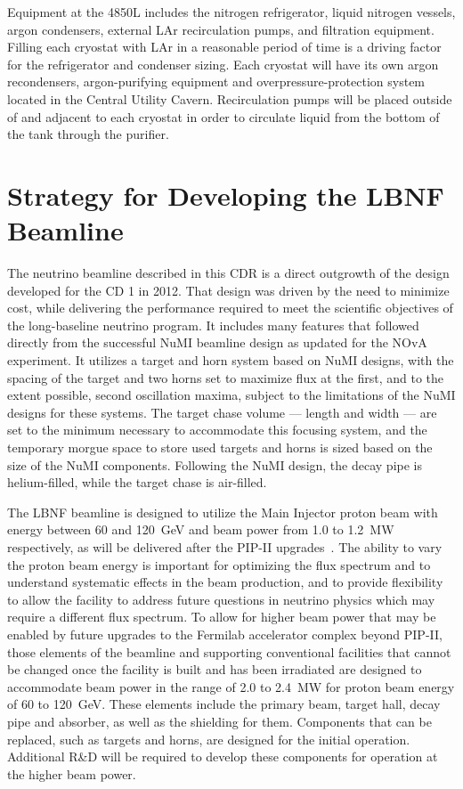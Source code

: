 Equipment at the 4850L includes the nitrogen refrigerator, liquid nitrogen vessels, argon condensers, external LAr recirculation pumps, and filtration equipment. Filling each cryostat with LAr in a reasonable period of time is a driving factor for the refrigerator and condenser sizing.  Each cryostat will have its own argon recondensers, argon-purifying equipment and overpressure-protection system located in the Central Utility Cavern. Recirculation pumps will be placed outside of and adjacent to each cryostat in order to circulate liquid from the bottom of the tank through the purifier.
 
\section{Strategy for Developing the LBNF Beamline}
 
The neutrino beamline described in this CDR is a direct outgrowth of the design~\cite{lbnecdr} developed for the 
CD 1 in 2012.  That design was driven by the need to minimize cost, while delivering the performance required to meet the scientific objectives of the long-baseline neutrino program.  It includes many features that followed directly from the 
successful NuMI beamline design as updated for the NOvA experiment.  It utilizes a target and horn system based on NuMI designs, with the spacing of the target and two horns set to maximize flux at the first, and to the extent possible, second 
oscillation maxima, subject to the limitations of  the NuMI designs for these systems.  The target chase volume --- length and width --- are set to the minimum necessary to accommodate this focusing system, and the temporary morgue space to store 
used targets and horns is sized based on the size of the NuMI components.  Following the NuMI design, the decay pipe is helium-filled, while the target chase is air-filled.  
 
The LBNF beamline is designed to utilize the Main Injector proton beam with energy between 60 and 120~GeV and beam power from 1.0 to 1.2~MW respectively, as will be delivered after the PIP-II upgrades~\cite{pip2-2013}.  
The ability to vary the 
proton beam energy is important for optimizing the flux spectrum and to understand systematic effects in the beam production, and to provide flexibility to allow the facility to address future questions in neutrino physics which may require a 
different flux spectrum.  To allow for higher beam power that may be enabled by future upgrades to the Fermilab accelerator complex beyond PIP-II, those elements of the beamline and supporting conventional facilities that cannot be changed once 
the facility is built and has been irradiated are designed to accommodate beam power in the range of 2.0 to 2.4~MW for proton beam energy of 60 to 120~GeV.  These elements include the primary beam, target hall, decay pipe and absorber, as 
well as the shielding for them.  Components that can be replaced, such as targets and horns, are designed for the  initial operation.  %
Additional R\&D
will be required to develop these components %
for operation at the higher beam power. 

